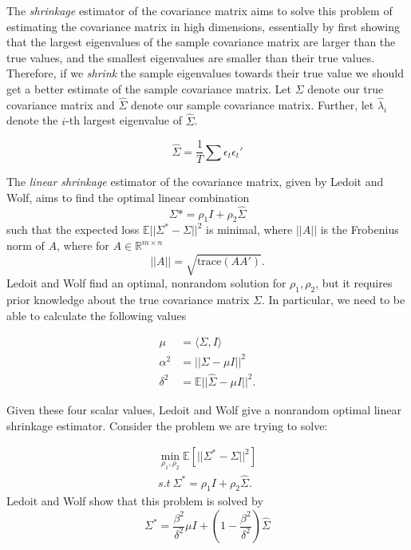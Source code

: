 \documentclass{article} %
\numberwithin{equation}{section} %
\numberwithin{figure}{section} %
\numberwithin{table}{section} %
\begin{document}
 The \textit{shrinkage} estimator of the covariance matrix aims to solve this problem of estimating the covariance matrix in high dimensions, essentially by first showing that the largest eigenvalues of the sample covariance matrix are larger than the true values, and the smallest eigenvalues are smaller than their true values. Therefore, if we \textit{shrink} the sample eigenvalues towards their true value we should get a better estimate of the sample covariance matrix. Let $\Sigma$ denote our true covariance matrix and $\hat{\Sigma}$ denote our sample covariance matrix. Further, let $\hat{\lambda}_i$ denote the $i$-th largest eigenvalue of $\hat{\Sigma}$.

\begin{equation} \label{eq: sample_covariance}
\hat{\Sigma} = \frac{1}{T} \sum \epsilon_t \epsilon_t'
\end{equation}

The \textit{linear shrinkage} estimator of the covariance matrix, given by Ledoit and Wolf, aims to find the optimal linear combination
\begin{equation}
\Sigma* = \rho_1 I + \rho_2 \hat{\Sigma}
\end{equation}
such that the expected loss $\mathbb{E}||\Sigma^* - \Sigma||^2$ is minimal, where $||A||$ is the Frobenius norm of $A$, where for $A \in \mathbb{R}^{m \times n}$
\begin{equation}
||A|| = \sqrt{\text{trace}(AA')}.
\end{equation}
Ledoit and Wolf find an optimal, nonrandom solution for $\rho_1, \rho_2$, but it requires prior knowledge about the true covariance matrix $\Sigma$. In particular, we need to be able to calculate the following values

\begin{align}
\mu &= \langle \Sigma , I \rangle \nonumber \\
\alpha^2 &= || \Sigma - \mu I ||^2 \nonumber \\
\delta^2 &= \mathbb{E}||\hat{\Sigma} - \mu I ||^2.
\end{align}

Given these four scalar values, Ledoit and Wolf give a nonrandom optimal linear shrinkage estimator. Consider the problem we are trying to solve:

\begin{align}
\nonumber
\min\limits_{\rho_1, \rho_2} \mathbb{E} \left[ || \Sigma^* - \Sigma ||^2 \right]\\
s.t  \ \Sigma ^* = \rho_1 I + \rho_2 \hat{\Sigma}.
\end{align}
Ledoit and Wolf show that this problem is solved by
\begin{equation}
\Sigma ^* = \frac{\beta^2}{\delta^2} \mu I + \left(1 - \frac{\beta^2}{\delta^2}\right) \hat{\Sigma}
\end{equation}
\end{document}
